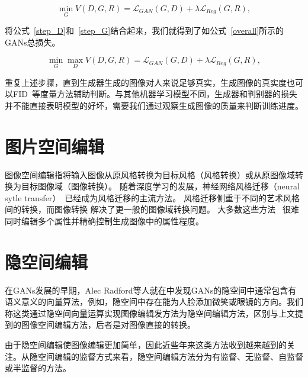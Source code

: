 \begin{equation}
    \min _{G} V(D, G, R) = \mathcal{L}_{GAN}(G, D) + \lambda \mathcal{L}_{Reg}(G, R),
    \label{step_G}
\end{equation}

将公式~\ref{step_D}和~\ref{step_G}结合起来，我们就得到了如公式~\ref{overall}所示的GANs总损失。

\begin{equation}
    \min _{G} \max _{D} V(D, G, R) = \mathcal{L}_{GAN}(G, D) + \lambda \mathcal{L}_{Reg}(G, R),
\end{equation}

重复上述步骤，直到生成器生成的图像对人来说足够真实，生成图像的真实度也可以FID~\cite{fid}等度量方法辅助判断。与其他机器学习模型不同，生成器和判别器的损失并不能直接表明模型的好坏，需要我们通过观察生成图像的质量来判断训练进度。

\section{图片空间编辑}

图像空间编辑指将输入图像从原风格转换为目标风格（风格转换）或从原图像域转换为目标图像域（图像转换）。 随着深度学习的发展，神经网络风格迁移（neural sytle transfer）~\cite{transfer0,transfer1,transfer2}已经成为风格迁移的主流方法。 风格迁移侧重于不同的艺术风格间的转换，而图像转换\cite{i2i0,i2i1,i2i2,cyclegan} 解决了更一般的图像域转换问题。
大多数这些方法~\cite{yu2018super,lu2018attribute} 很难同时编辑多个属性并精确控制生成图像中的属性程度。

\section{隐空间编辑}

在GANs发展的早期，Alec Radford等人就在\cite{DCGAN}中发现GANs的隐空间中通常包含有语义意义的向量算法，例如，隐空间中存在能为人脸添加微笑或眼镜的方向。我们称这类通过隐空间向量运算实现图像编辑发方法为隐空间编辑方法，区别与上文提到的图像空间编辑方法，后者是对图像直接的转换。

由于隐空间编辑使图像编辑更加简单，因此近些年来这类方法收到越来越到的关注。从隐空间编辑的监督方式来看，隐空间编辑方法分为有监督、无监督、自监督或半监督的方法。


